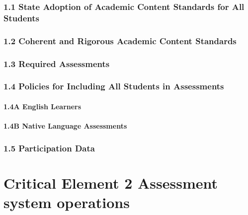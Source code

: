 \documentclass[]{book}
\begin{document}
\hypertarget{state-adoption-of-academic-content-standards-for-all-students}{%
\subsection{1.1 State Adoption of Academic Content Standards for All Students}\label{state-adoption-of-academic-content-standards-for-all-students}}

\hypertarget{coherent-and-rigorous-academic-content-standards}{%
\subsection{1.2 Coherent and Rigorous Academic Content Standards}\label{coherent-and-rigorous-academic-content-standards}}

\hypertarget{required-assessments}{%
\subsection{1.3 Required Assessments}\label{required-assessments}}

\hypertarget{policies-for-including-all-students-in-assessments}{%
\subsection{1.4 Policies for Including All Students in Assessments}\label{policies-for-including-all-students-in-assessments}}

\hypertarget{a-english-learners}{%
\subsubsection{1.4A English Learners}\label{a-english-learners}}

\hypertarget{b-native-language-assessments}{%
\subsubsection{1.4B Native Language Assessments}\label{b-native-language-assessments}}

\hypertarget{participation-data}{%
\subsection{1.5 Participation Data}\label{participation-data}}

\hypertarget{critical-element-2-assessment-system-operations}{%
\chapter{Critical Element 2 Assessment system operations}\label{critical-element-2-assessment-system-operations}}
\end{document}

